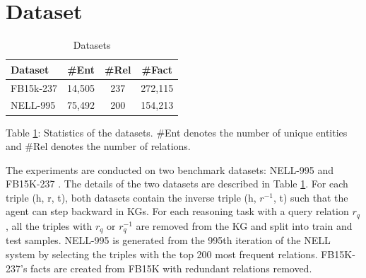 \section{Dataset}
    \begin{table}[h!]
\centering
\caption{Datasets}\label{Tbl:datatable}
\begin{tabular}{|l|c|c|c|}
\hline
Dataset   & \#Ent & \#Rel & \#Fact  \\ \hline
FB15k-237 & 14,505                        & 237   & 272,115 \\ \hline
NELL-995  & 75,492                        & 200   & 154,213 \\ \hline
\end{tabular}
\label{table:KGstats}
\end{table}
Table \ref{table:KGstats}: Statistics of the datasets. \#Ent denotes the number of unique entities and \#Rel denotes the number of relations.

The experiments are conducted on two benchmark datasets: NELL-995 \cite{Xiong2017} and FB15K-237 \cite{Toutanova2015}. The details of the two datasets are described in Table \ref{table:KGstats}. For each triple (h, r, t), both datasets contain the inverse triple (h, $r^{-1}$, t) such that the agent can step backward in KGs. For each reasoning task with a query relation $r_q$, all the triples with $r_q$ or $r_q^{-1}$ are removed from the KG and split into train and test samples. NELL-995 is generated from the 995th iteration of the NELL system \cite{Carlson2010} by selecting the triples with the top 200 most frequent relations. FB15K-237's facts are created from FB15K \cite{Bordes2013} with redundant relations removed.


    
